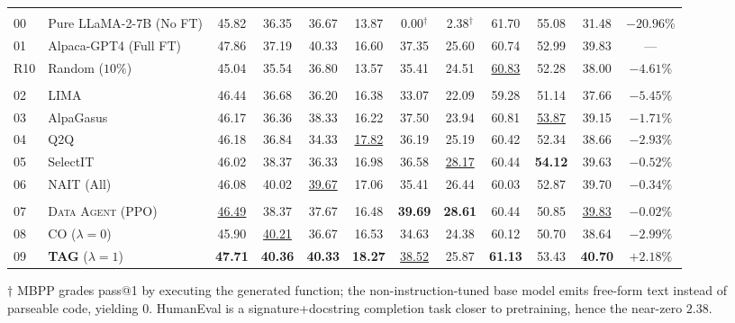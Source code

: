 \begin{table}[t]
\begin{threeparttable}
\begin{tabular}{@{}llcccccccccc@{}}
\rowcolor{gray!15}
\multicolumn{12}{@{}l}{\textbf{Data-side references}}\\
00 & Pure LLaMA-2-7B (No FT)
    & 45.82 & 36.35
    & 36.67 & 13.87
    & 0.00$^\dagger$ & 2.38$^\dagger$
    & 61.70 & 55.08
    & 31.48 & $-20.96\%$ \\
01 & Alpaca-GPT4 (Full FT)
    & 47.86 & 37.19
    & 40.33 & 16.60
    & 37.35 & 25.60
    & 60.74 & 52.99
    & 39.83 & --- \\
R10 & Random ($10\%$)
    & 45.04 & 35.54
    & 36.80 & 13.57
    & 35.41 & 24.51
    & \underline{60.83} & 52.28
    & 38.00 & $-4.61\%$ \\
\midrule
\rowcolor{gray!15}
\multicolumn{12}{@{}l}{\textbf{Static 10\% IT-data selection}}\\
02 & LIMA
    & 46.44 & 36.68
    & 36.20 & 16.38
    & 33.07 & 22.09
    & 59.28 & 51.14
    & 37.66 & $-5.45\%$ \\
03 & AlpaGasus
    & 46.17 & 36.36
    & 38.33 & 16.22
    & 37.50 & 23.94
    & 60.81 & \underline{53.87}
    & 39.15 & $-1.71\%$ \\
04 & Q2Q
    & 46.18 & 36.84
    & 34.33 & \underline{17.82}
    & 36.19 & 25.19
    & 60.42 & 52.34
    & 38.66 & $-2.93\%$ \\
05 & SelectIT
    & 46.02 & 38.37
    & 36.33 & 16.98
    & 36.58 & \underline{28.17}
    & 60.44 & \textbf{54.12}
    & 39.63 & $-0.52\%$ \\
06 & NAIT (All)
    & 46.08 & 40.02
    & \underline{39.67} & 17.06
    & 35.41 & 26.44
    & 60.03 & 52.87
    & 39.70 & $-0.34\%$ \\
\midrule
\rowcolor{gray!15}
\multicolumn{12}{@{}l}{\textbf{Dynamic 10\% selection}}\\
07 & \textsc{Data Agent (PPO)}
    & \underline{46.49} & 38.37
    & 37.67 & 16.48
    & \textbf{39.69} & \textbf{28.61}
    & 60.44 & 50.85
    & \underline{39.83} & \underline{$-0.02\%$} \\
08 & CO ($\lambda=0$)
    & 45.90 & \underline{40.21}
    & 36.67 & 16.53
    & 34.63 & 24.38
    & 60.12 & 50.70
    & 38.64 & $-2.99\%$ \\
\rowcolor{red!8}
09 & \textbf{\textsc{TAG}} ($\lambda=1$)
    & \textbf{47.71} & \textbf{40.36}
    & \textbf{40.33} & \textbf{18.27}
    & \underline{38.52} & 25.87
    & \textbf{61.13} & 53.43
    & \textbf{40.70} & \textbf{$+2.18\%$} \\
\bottomrule
\end{tabular}
\begin{tablenotes}[flushleft]
\footnotesize
\item[$\dagger$] MBPP grades pass@1 by executing the generated
function; the non-instruction-tuned base model emits free-form
text instead of parseable code, yielding $0$. HumanEval is a
signature+docstring completion task closer to pretraining, hence
the near-zero $2.38$.
\end{tablenotes}
\end{threeparttable}
\end{table}

